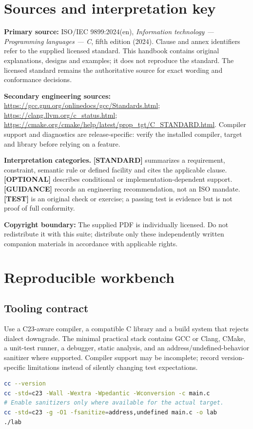 \documentclass[10pt,letterpaper,oneside]{report}
\begin{document}
\chapter*{Sources and interpretation key}
\textbf{Primary source:} ISO/IEC 9899:2024(en), \emph{Information technology --- Programming languages --- C}, fifth edition (2024). Clause and annex identifiers refer to the supplied licensed standard. This handbook contains original explanations, designs and examples; it does not reproduce the standard. The licensed standard remains the authoritative source for exact wording and conformance decisions.\par
\textbf{Secondary engineering sources:} \url{https://gcc.gnu.org/onlinedocs/gcc/Standards.html}; \url{https://clang.llvm.org/c_status.html}; \url{https://cmake.org/cmake/help/latest/prop_tgt/C_STANDARD.html}. Compiler support and diagnostics are release-specific: verify the installed compiler, target and library before relying on a feature.\par
\begin{keybox}\textbf{Interpretation categories.} \textbf{[STANDARD]} summarizes a requirement, constraint, semantic rule or defined facility and cites the applicable clause. \textbf{[OPTIONAL]} describes conditional or implementation-dependent support. \textbf{[GUIDANCE]} records an engineering recommendation, not an ISO mandate. \textbf{[TEST]} is an original check or exercise; a passing test is evidence but is not proof of full conformity.\end{keybox}
\textbf{Copyright boundary:} The supplied PDF is individually licensed. Do not redistribute it with this suite; distribute only these independently written companion materials in accordance with applicable rights.\par


\chapter{Reproducible workbench}
\section{Tooling contract}
Use a C23-aware compiler, a compatible C library and a build system that rejects dialect downgrade. The minimal practical stack contains GCC or Clang, CMake, a unit-test runner, a debugger, static analysis, and an address/undefined-behavior sanitizer where supported. Compiler support may be incomplete; record version-specific limitations instead of silently changing test expectations.
\begin{lstlisting}[language=bash]
cc --version
cc -std=c23 -Wall -Wextra -Wpedantic -Wconversion -c main.c
# Enable sanitizers only where available for the actual target.
cc -std=c23 -g -O1 -fsanitize=address,undefined main.c -o lab
./lab
\end{lstlisting}
\end{document}
